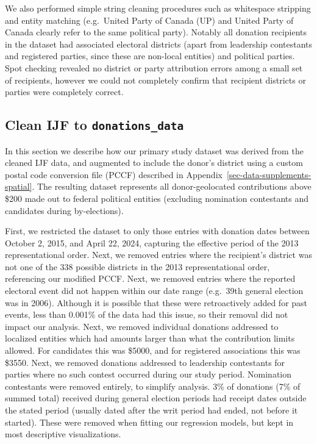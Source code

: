\documentclass[
  letterpaper,
  DIV=11,
  numbers=noendperiod]{scrartcl}
\begin{document}
We also performed simple string cleaning procedures such as whitespace
stripping and entity matching (e.g.~United Party of Canada (UP) and
United Party of Canada clearly refer to the same political party).
Notably all donation recipients in the dataset had associated electoral
districts (apart from leadership contestants and registered parties,
since these are non-local entities) and political parties. Spot checking
revealed no district or party attribution errors among a small set of
recipients, however we could not completely confirm that recipient
districts or parties were completely correct.

\subsection{\texorpdfstring{Clean IJF to
\texttt{donations\_data}}{Clean IJF to donations\_data}}\label{sec-IJF-to-donations-data}

In this section we describe how our primary study dataset was derived
from the cleaned IJF data, and augmented to include the donor's district
using a custom postal code conversion file (PCCF) described in
Appendix~\ref{sec-data-supplements-spatial}. The resulting dataset
represents all donor-geolocated contributions above \$200 made out to
federal political entities (excluding nomination contestants and
candidates during by-elections).

First, we restricted the dataset to only those entries with donation
dates between October 2, 2015, and April 22, 2024, capturing the
effective period of the 2013 representational order. Next, we removed
entries where the recipient's district was not one of the 338 possible
districts in the 2013 representational order, referencing our modified
PCCF. Next, we removed entries where the reported electoral event did
not happen within our date range (e.g.~39th general election was in
2006). Although it is possible that these were retroactively added for
past events, less than 0.001\% of the data had this issue, so their
removal did not impact our analysis. Next, we removed individual
donations addressed to localized entities which had amounts larger than
what the contribution limits allowed. For candidates this was \$5000,
and for registered associations this was \$3550. Next, we removed
donations addressed to leadership contestants for parties where no such
contest occurred during our study period. Nomination contestants were
removed entirely, to simplify analysis. 3\% of donations (7\% of summed
total) received during general election periods had receipt dates
outside the stated period (usually dated after the writ period had
ended, not before it started). These were removed when fitting our
regression models, but kept in most descriptive visualizations.
\end{document}
